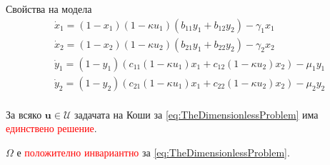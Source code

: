 \begin{frame}[t]{Свойства на модела}
  \begin{equation}
    \label{eq:TheDimensionlessProblem}
    \begin{split}
      &\dot{x}_1 = (1-x_1) (1-\kappa u_1) \left(b_{11} y_1 + b_{12} y_2\right) - \gamma_1 x_1 \\
      &\dot{x}_2 = (1-x_2) (1-\kappa u_2)\left(b_{21} y_1 + b_{22} y_2\right) - \gamma_2 x_2 \\
      &\dot{y}_1 = (1-y_1) \left(c_{11}(1-\kappa u_1) x_1 + c_{12}(1-\kappa u_2) x_2\right) - \mu_1 y_1 \\
      &\dot{y}_2 = (1-y_2) \left(c_{21}(1-\kappa u_1) x_1 + c_{22} (1-\kappa u_2) x_2\right) - \mu_2 y_2 \\
    \end{split}
  \end{equation}

  \begin{proposition}
    За всяко $\boldsymbol{u} \in \mathcal{U}$ задачата на Коши за \eqref{eq:TheDimensionlessProblem} има \textcolor{red}{единствено решение}.
  \end{proposition}


  \begin{proposition}
    $\Omega$ е \textcolor{red}{положително инвариантно} за \eqref{eq:TheDimensionlessProblem}.
  \end{proposition}

\end{frame}


